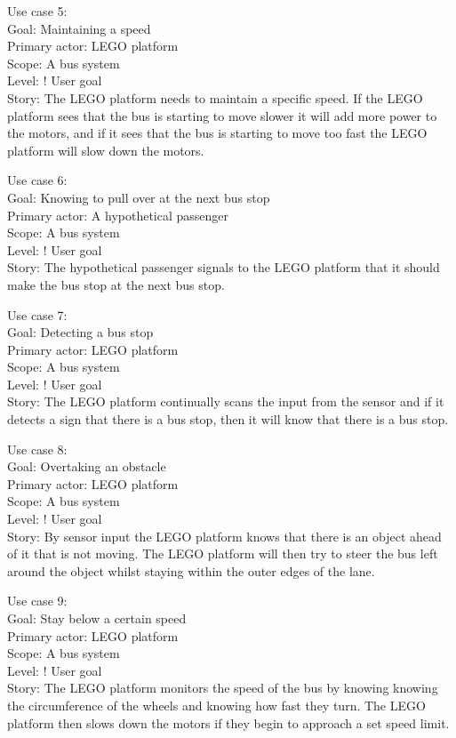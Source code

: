 Use case 5:\\
Goal: Maintaining a speed\\
Primary actor: LEGO platform\\
Scope: A bus system\\
Level: ! User goal\\
Story: The LEGO platform needs to maintain a specific speed. 
If the LEGO platform sees that the bus is starting to move slower it will add more power to the motors, and if it sees that the bus is starting to move too fast the LEGO platform will slow down the motors.

Use case 6:\\
Goal: Knowing to pull over at the next bus stop\\
Primary actor: A hypothetical passenger\\
Scope: A bus system\\
Level: ! User goal\\
Story: The hypothetical passenger signals to the LEGO platform that it should make the bus stop at the next bus stop.

Use case 7:\\
Goal: Detecting a bus stop\\
Primary actor: LEGO platform\\
Scope: A bus system\\
Level: ! User goal\\
Story: The LEGO platform continually scans the input from the sensor and if it detects a sign that there is a bus stop, then it will know that there is a bus stop.

Use case 8:\\
Goal: Overtaking an obstacle\\
Primary actor: LEGO platform\\
Scope: A bus system\\
Level: ! User goal\\
Story: By sensor input the LEGO platform knows that there is an object ahead of it that is not moving. The LEGO platform will then try to steer the bus left around the object whilst staying within the outer edges of the lane.

Use case 9:\\
Goal: Stay below a certain speed\\
Primary actor: LEGO platform\\
Scope: A bus system\\
Level: ! User goal\\
Story: The LEGO platform monitors the speed of the bus by knowing knowing the circumference of the wheels and knowing how fast they turn. The LEGO platform then slows down the motors if they begin to approach a set speed limit.

